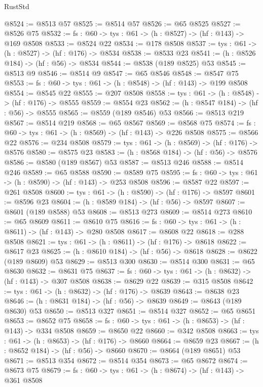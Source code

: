 \begin{lexlean}{RustStd}
\begin{coremodule}
@8524 := @8513 @57
@8525 := @8514 @57
@8526 := @65 @8525
@8527 := @8526 @75
@8532 := {fs : @60} -> {tys : @61} -> (h : @8527) -> (hf : @143) -> @169 @8508
@8533 := @8524 @22
@8534 := @178 @8508
@8537 := {tys : @61} -> (h : @8527) -> (hf : @176) -> @8534
@8538 := @8533 @23
@8541 := (h : @8526 @184) -> (hf : @56) -> @8534
@8544 := @8538 (@189 @8525) @53
@8545 := @8513 @9
@8546 := @8514 @9
@8547 := @65 @8546
@8548 := @8547 @75
@8553 := {fs : @60} -> {tys : @61} -> (h : @8548) -> (hf : @143) -> @199 @8508
@8554 := @8545 @22
@8555 := @207 @8508
@8558 := {tys : @61} -> (h : @8548) -> (hf : @176) -> @8555
@8559 := @8554 @23
@8562 := (h : @8547 @184) -> (hf : @56) -> @8555
@8565 := @8559 (@189 @8546) @53
@8566 := @8513 @219
@8567 := @8514 @219
@8568 := @65 @8567
@8569 := @8568 @75
@8574 := {fs : @60} -> {tys : @61} -> (h : @8569) -> (hf : @143) -> @226 @8508
@8575 := @8566 @22
@8576 := @234 @8508
@8579 := {tys : @61} -> (h : @8569) -> (hf : @176) -> @8576
@8580 := @8575 @23
@8583 := (h : @8568 @184) -> (hf : @56) -> @8576
@8586 := @8580 (@189 @8567) @53
@8587 := @8513 @246
@8588 := @8514 @246
@8589 := @65 @8588
@8590 := @8589 @75
@8595 := {fs : @60} -> {tys : @61} -> (h : @8590) -> (hf : @143) -> @253 @8508
@8596 := @8587 @22
@8597 := @261 @8508
@8600 := {tys : @61} -> (h : @8590) -> (hf : @176) -> @8597
@8601 := @8596 @23
@8604 := (h : @8589 @184) -> (hf : @56) -> @8597
@8607 := @8601 (@189 @8588) @53
@8608 := @8513 @273
@8609 := @8514 @273
@8610 := @65 @8609
@8611 := @8610 @75
@8616 := {fs : @60} -> {tys : @61} -> (h : @8611) -> (hf : @143) -> @280 @8508
@8617 := @8608 @22
@8618 := @288 @8508
@8621 := {tys : @61} -> (h : @8611) -> (hf : @176) -> @8618
@8622 := @8617 @23
@8625 := (h : @8610 @184) -> (hf : @56) -> @8618
@8628 := @8622 (@189 @8609) @53
@8629 := @8513 @300
@8630 := @8514 @300
@8631 := @65 @8630
@8632 := @8631 @75
@8637 := {fs : @60} -> {tys : @61} -> (h : @8632) -> (hf : @143) -> @307 @8508
@8638 := @8629 @22
@8639 := @315 @8508
@8642 := {tys : @61} -> (h : @8632) -> (hf : @176) -> @8639
@8643 := @8638 @23
@8646 := (h : @8631 @184) -> (hf : @56) -> @8639
@8649 := @8643 (@189 @8630) @53
@8650 := @8513 @327
@8651 := @8514 @327
@8652 := @65 @8651
@8653 := @8652 @75
@8658 := {fs : @60} -> {tys : @61} -> (h : @8653) -> (hf : @143) -> @334 @8508
@8659 := @8650 @22
@8660 := @342 @8508
@8663 := {tys : @61} -> (h : @8653) -> (hf : @176) -> @8660
@8664 := @8659 @23
@8667 := (h : @8652 @184) -> (hf : @56) -> @8660
@8670 := @8664 (@189 @8651) @53
@8671 := @8513 @354
@8672 := @8514 @354
@8673 := @65 @8672
@8674 := @8673 @75
@8679 := {fs : @60} -> {tys : @61} -> (h : @8674) -> (hf : @143) -> @361 @8508

\end{coremodule}
\end{lexlean}
